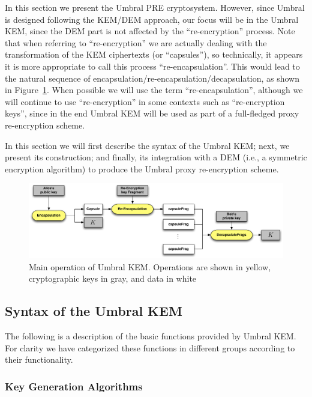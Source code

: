 \documentclass{amsart}
\begin{document}
In this section we present the Umbral PRE cryptosystem. However, since Umbral is designed following the KEM/DEM approach, our focus will be in the Umbral KEM, since the DEM part is not affected by the ``re-encryption'' process. Note that when referring to ``re-encryption'' we are actually dealing with the transformation of the KEM ciphertexts (or ``capsules''), so technically, it appears it is more appropriate to call this process ``re-encapsulation''. This would lead to the natural sequence of encapsulation/re-encapsulation/decapsulation, as shown in Figure~\ref{fig:umbral-kem}. When possible we will use the term ``re-encapsulation'', although we will continue to use ``re-encryption'' in some contexts such as ``re-encryption keys'', since in the end Umbral KEM will be used as part of a full-fledged proxy re-encryption scheme. 

In this section we will first describe the syntax of the Umbral KEM; next, we present its construction; and finally, its integration with a DEM (i.e., a symmetric encryption algorithm) to produce the Umbral proxy re-encryption scheme. 

\begin{figure}%
\centering
\includegraphics[width=\textwidth]{figures/umbral-kem-flow.pdf}
\caption{Main operation of Umbral KEM. Operations are shown in yellow, cryptographic keys in gray, and data in white}
\label{fig:umbral-kem}
\end{figure}

\subsection{Syntax of the Umbral KEM}

The following is a description of the basic functions provided by Umbral KEM. For clarity we have categorized these functions in different groups according to their functionality. 

\subsubsection{Key Generation Algorithms}
\end{document}
